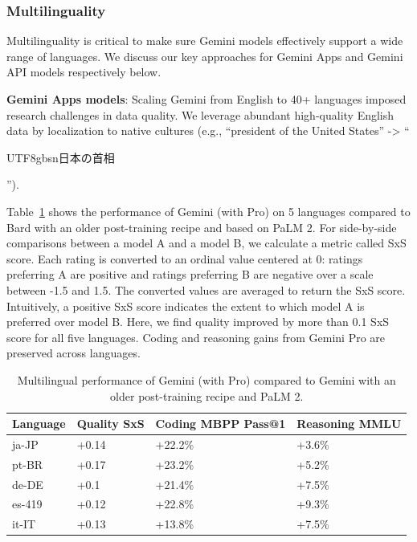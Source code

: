 \subsubsection{Multilinguality}
\label{sec:post-training-ml}

Multilinguality is critical to make sure Gemini models effectively support a wide range of languages. We discuss our key approaches for Gemini Apps and Gemini API models respectively below. 

\textbf{Gemini Apps models}: Scaling Gemini from English to 40+ languages imposed research challenges in data quality. We leverage abundant high-quality English data by localization to native cultures (e.g., “president of the United States” -> “
\begin{CJK*}{UTF8}{gbsn}日本の首相\end{CJK*}”). 

Table~\ref{tab:posttrain-gemini-multilingual} shows the performance of Gemini (with Pro) on 5 languages compared to Bard with an older post-training recipe and based on PaLM 2. For side-by-side comparisons between a model A and a model B, we calculate a metric called SxS score. Each rating is converted to an ordinal value centered at 0: ratings preferring A are positive and ratings preferring B are negative over a scale between -1.5 and 1.5. The converted values are averaged to return the SxS score. Intuitively, a positive SxS score indicates the extent to which model A is preferred over model B. Here, we find quality improved by more than 0.1 SxS score for all five languages. Coding and reasoning gains from Gemini Pro are preserved across languages.

\begin{table}[ht!]
    \centering
    \scriptsize
    \begin{tabular}{p{1.8cm}|p{2.0cm}p{2.0cm}p{2.0cm}}
    \toprule
    Language & Quality \newline \tiny{SxS} & Coding \newline \tiny{MBPP Pass@1\newline\citet{austin2021program}} & Reasoning \newline \tiny{MMLU\newline\citet{mmlu}} \\
    \midrule
ja-JP & +0.14 & +22.2\% & +3.6\%\\
pt-BR & +0.17 & +23.2\% & +5.2\%\\
de-DE & +0.1 & +21.4\% & +7.5\%\\
es-419 & +0.12 & +22.8\% & +9.3\%\\
it-IT & +0.13 & +13.8\% & +7.5\%\\
    \bottomrule
    \end{tabular}
    \caption{Multilingual performance of Gemini (with Pro) compared to Gemini with an older post-training recipe and PaLM 2.}
    \label{tab:posttrain-gemini-multilingual}
\end{table}

